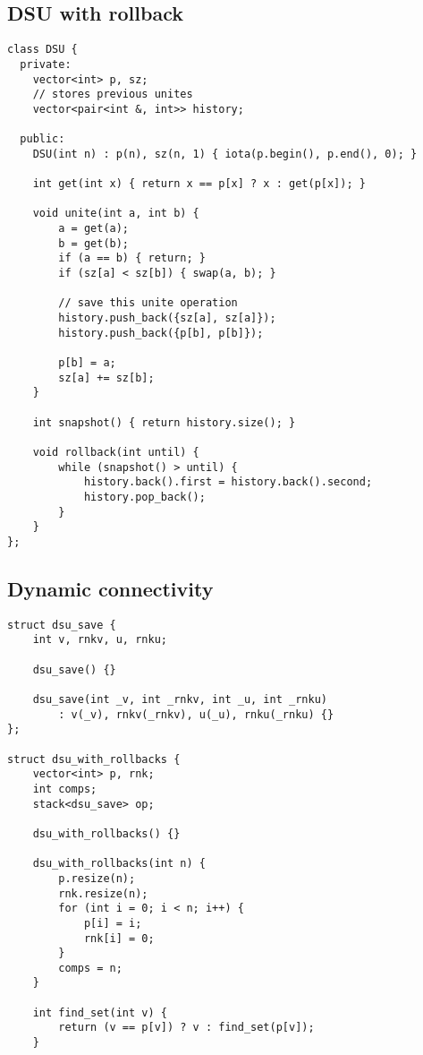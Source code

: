 \documentclass[10pt]{article}
\begin{document}
\begin{multicols*}{2}
\begin{lstlisting}[style=compactcpp]
\end{lstlisting}

\subsection{DSU with rollback}

\begin{lstlisting}[style=compactcpp]
class DSU {
  private:
	vector<int> p, sz;
	// stores previous unites
	vector<pair<int &, int>> history;

  public:
	DSU(int n) : p(n), sz(n, 1) { iota(p.begin(), p.end(), 0); }

	int get(int x) { return x == p[x] ? x : get(p[x]); }

	void unite(int a, int b) {
		a = get(a);
		b = get(b);
		if (a == b) { return; }
		if (sz[a] < sz[b]) { swap(a, b); }

		// save this unite operation
		history.push_back({sz[a], sz[a]});
		history.push_back({p[b], p[b]});

		p[b] = a;
		sz[a] += sz[b];
	}

	int snapshot() { return history.size(); }

	void rollback(int until) {
		while (snapshot() > until) {
			history.back().first = history.back().second;
			history.pop_back();
		}
	}
};

\end{lstlisting}

\subsection{Dynamic connectivity}

\begin{lstlisting}[style=compactcpp]
struct dsu_save {
    int v, rnkv, u, rnku;

    dsu_save() {}

    dsu_save(int _v, int _rnkv, int _u, int _rnku)
        : v(_v), rnkv(_rnkv), u(_u), rnku(_rnku) {}
};

struct dsu_with_rollbacks {
    vector<int> p, rnk;
    int comps;
    stack<dsu_save> op;

    dsu_with_rollbacks() {}

    dsu_with_rollbacks(int n) {
        p.resize(n);
        rnk.resize(n);
        for (int i = 0; i < n; i++) {
            p[i] = i;
            rnk[i] = 0;
        }
        comps = n;
    }

    int find_set(int v) {
        return (v == p[v]) ? v : find_set(p[v]);
    }


\end{lstlisting}
\end{multicols*}
\end{document}
